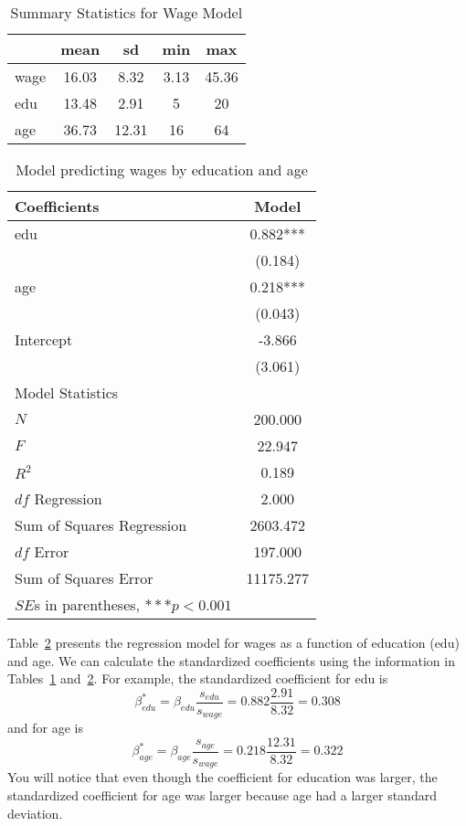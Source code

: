 \begin{table}[htbp]
\caption{\label{tab:wagesum} Summary Statistics for Wage Model}\centering\medskip
\begin{tabular}{lcccc}
 & mean & sd & min & max \\ \hline
wage & 16.03 & 8.32 & 3.13 & 45.36 \\
edu & 13.48 & 2.91 & 5 & 20 \\
age & 36.73 & 12.31 & 16 & 64 \\ \hline
 \end{tabular}
\end{table}
\begin{table}[htbp]\centering
 \caption{Model predicting wages by education and age
\label{tab:wagereg}}
\begin{tabular}{lc}
\hline
Coefficients      &    Model  \\
\hline
edu     &    0.882***\\
      &   (0.184)  \\
age     &    0.218***\\
      &   (0.043)  \\
Intercept    &   -3.866  \\
      &   (3.061)  \\
\hline
\multicolumn{1}{l}{Model Statistics} \\
\hline
$N$      &   200.000  \\
$F$      &   22.947  \\
$R^2$     &    0.189  \\
$df$ Regression     &    2.000  \\
Sum of Squares Regression     &  2603.472  \\
$df$ Error    &   197.000 \\
Sum of Squares Error    &  11175.277  \\
\hline
\multicolumn{1}{l}{$SE$s in parentheses, $***p<0.001$} \\
\hline
\end{tabular}
\end{table}
Table~\ref{tab:wagereg} presents the regression model for wages as a function of education (edu) and age.
We can calculate the standardized coefficients using the information in Tables~\ref{tab:wagesum} and~\ref{tab:wagereg}. For example, the standardized coefficient for edu is
\[
\beta_{edu}^*=\beta_{edu}\frac{s_{edu}}{s_{wage}}=0.882\frac{2.91}{8.32}=0.308
\]
and for age is
\[
\beta_{age}^*=\beta_{age}\frac{s_{age}}{s_{wage}}=0.218\frac{12.31}{8.32}=0.322
\]
You will notice that even though the coefficient for education was larger, the standardized coefficient for age was larger because age had a larger standard deviation.
